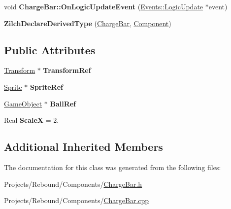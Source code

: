 \begin{DoxyCompactItemize}
\item 
\hypertarget{classDCEngine_1_1Components_1_1ChargeBar_a3468e17a00bdbb9dd028845fb75dea45}{void {\bfseries Charge\-Bar\-::\-On\-Logic\-Update\-Event} (\hyperlink{classDCEngine_1_1Events_1_1LogicUpdate}{Events\-::\-Logic\-Update} $\ast$event)}\label{classDCEngine_1_1Components_1_1ChargeBar_a3468e17a00bdbb9dd028845fb75dea45}

\item 
\hypertarget{classDCEngine_1_1Components_1_1ChargeBar_a451e089900b0024cc37d6c56d8d595f6}{{\bfseries Zilch\-Declare\-Derived\-Type} (\hyperlink{classDCEngine_1_1Components_1_1ChargeBar}{Charge\-Bar}, \hyperlink{classDCEngine_1_1Component}{Component})}\label{classDCEngine_1_1Components_1_1ChargeBar_a451e089900b0024cc37d6c56d8d595f6}

\end{DoxyCompactItemize}
\subsection*{Public Attributes}
\begin{DoxyCompactItemize}
\item 
\hypertarget{classDCEngine_1_1Components_1_1ChargeBar_a819410826366be6b5c6ae4679fd29420}{\hyperlink{classDCEngine_1_1Components_1_1Transform}{Transform} $\ast$ {\bfseries Transform\-Ref}}\label{classDCEngine_1_1Components_1_1ChargeBar_a819410826366be6b5c6ae4679fd29420}

\item 
\hypertarget{classDCEngine_1_1Components_1_1ChargeBar_af44d439a53a7d34d55154fb97a21f7a7}{\hyperlink{classDCEngine_1_1Components_1_1Sprite}{Sprite} $\ast$ {\bfseries Sprite\-Ref}}\label{classDCEngine_1_1Components_1_1ChargeBar_af44d439a53a7d34d55154fb97a21f7a7}

\item 
\hypertarget{classDCEngine_1_1Components_1_1ChargeBar_a7bdb6793eed0ab0b4d6be43e9e84a60a}{\hyperlink{classDCEngine_1_1GameObject}{Game\-Object} $\ast$ {\bfseries Ball\-Ref}}\label{classDCEngine_1_1Components_1_1ChargeBar_a7bdb6793eed0ab0b4d6be43e9e84a60a}

\item 
\hypertarget{classDCEngine_1_1Components_1_1ChargeBar_aa41a40c70123b6834d99f38abc7ec6c7}{Real {\bfseries Scale\-X} = 2.}\label{classDCEngine_1_1Components_1_1ChargeBar_aa41a40c70123b6834d99f38abc7ec6c7}

\end{DoxyCompactItemize}
\subsection*{Additional Inherited Members}


The documentation for this class was generated from the following files\-:\begin{DoxyCompactItemize}
\item 
Projects/\-Rebound/\-Components/\hyperlink{ChargeBar_8h}{Charge\-Bar.\-h}\item 
Projects/\-Rebound/\-Components/\hyperlink{ChargeBar_8cpp}{Charge\-Bar.\-cpp}\end{DoxyCompactItemize}
